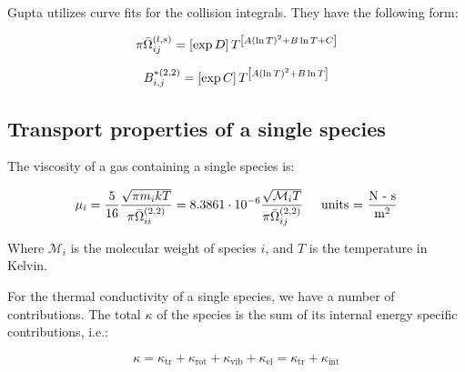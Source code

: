 \documentclass[10pt]{article}
\begin{document}
\begin{flushleft}
\begin{definition}
    Gupta utilizes curve fits for the collision integrals. They have the following form:

    \begin{equation}
        \pi \bar{\Omega}_{ij}^{(l,s)} = \left[ \exp{D} \right] T^{\left[ A (\ln T)^2 + B \ln T + C \right]}
    \end{equation}

    \begin{equation}
        B_{i,j}^{*(2,2)} = \left[ \exp{C} \right] T^{\left[ A (\ln T)^2 + B \ln T \right]}
    \end{equation}


\end{definition}

\subsection{Transport properties of a single species}

\begin{definition}

    The viscosity of a gas containing a single species is:  

    \begin{equation}
        \mu_i = \frac{5}{16} \frac{\sqrt{\pi m_i k T}}{\pi \bar{\Omega}_{ii}^{(2,2)}} = 8.3861 \cdot 10^{-6} \frac{\sqrt{\mathcal{M}_i T}}{\pi \bar{\Omega}_{ij}^{(2,2)}} \hspace{5mm} \text{units = } \frac{\text{N - s}}{\text{m}^2}
    \end{equation}

    Where $\mathcal{M}_i$ is the molecular weight of species $i$, and $T$ is the temperature in Kelvin. 

\end{definition}

\begin{definition}
    
    
    For the thermal conductivity of a single species, we have a number of contributions. The total $\kappa$ of the species is the sum of its internal energy specific contributions, i.e.:
    
    \begin{equation}
        \kappa = \kappa_\text{tr} + \kappa_\text{rot} + \kappa_\text{vib} + \kappa_\text{el} = \kappa_\text{tr} + \kappa_\text{int}
    \end{equation}


\end{definition}
\end{flushleft}
\end{document}
